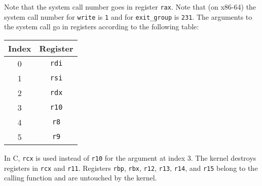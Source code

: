 Note that the system call number goes in register \texttt{rax}. Note
that (on x86-64) the system call number for \texttt{write} is
\texttt{1} and for \texttt{exit_group} is \texttt{231}. The arguments
to the system call go in registers according to the following table:

{\ttfamily\begin{tabular}{c c}
  \hline
  Index & Register \\
  \hline
  0 & \texttt{rdi} \\
  1 & \texttt{rsi} \\
  2 & \texttt{rdx} \\
  3 & \texttt{r10} \\
  4 & \texttt{r8} \\
  5 & \texttt{r9} \\
\end{tabular}}

In C, \texttt{rcx} is used instead of \texttt{r10} for the
argument at index 3. The kernel destroys registers in \texttt{rcx} and
\texttt{r11}. Registers \texttt{rbp}, \texttt{rbx},
\texttt{r12}, \texttt{r13}, \texttt{r14}, and
\texttt{r15} belong to the calling function and are untouched by the
kernel.

